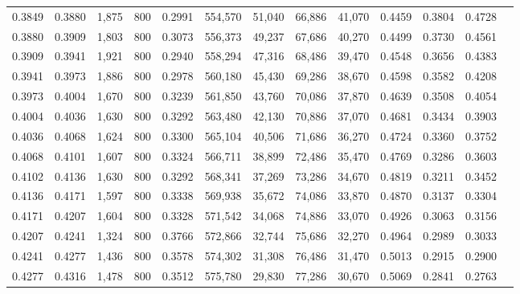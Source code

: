 \begin{tabular}{rrrrrrrrrrrrr}
0.3849 & 0.3880 &  1,875 &   800 &                                     0.2991 & 554,570 &  51,040 &  66,886 &  41,070 & 0.4459 & 0.3804 & 0.4728 \\
0.3880 & 0.3909 &  1,803 &   800 &                                     0.3073 & 556,373 &  49,237 &  67,686 &  40,270 & 0.4499 & 0.3730 & 0.4561 \\
0.3909 & 0.3941 &  1,921 &   800 &                                     0.2940 & 558,294 &  47,316 &  68,486 &  39,470 & 0.4548 & 0.3656 & 0.4383 \\
0.3941 & 0.3973 &  1,886 &   800 &                                     0.2978 & 560,180 &  45,430 &  69,286 &  38,670 & 0.4598 & 0.3582 & 0.4208 \\
0.3973 & 0.4004 &  1,670 &   800 &                                     0.3239 & 561,850 &  43,760 &  70,086 &  37,870 & 0.4639 & 0.3508 & 0.4054 \\
0.4004 & 0.4036 &  1,630 &   800 &                                     0.3292 & 563,480 &  42,130 &  70,886 &  37,070 & 0.4681 & 0.3434 & 0.3903 \\
0.4036 & 0.4068 &  1,624 &   800 &                                     0.3300 & 565,104 &  40,506 &  71,686 &  36,270 & 0.4724 & 0.3360 & 0.3752 \\
0.4068 & 0.4101 &  1,607 &   800 &                                     0.3324 & 566,711 &  38,899 &  72,486 &  35,470 & 0.4769 & 0.3286 & 0.3603 \\
0.4102 & 0.4136 &  1,630 &   800 &                                     0.3292 & 568,341 &  37,269 &  73,286 &  34,670 & 0.4819 & 0.3211 & 0.3452 \\
0.4136 & 0.4171 &  1,597 &   800 &                                     0.3338 & 569,938 &  35,672 &  74,086 &  33,870 & 0.4870 & 0.3137 & 0.3304 \\
0.4171 & 0.4207 &  1,604 &   800 &                                     0.3328 & 571,542 &  34,068 &  74,886 &  33,070 & 0.4926 & 0.3063 & 0.3156 \\
0.4207 & 0.4241 &  1,324 &   800 &                                     0.3766 & 572,866 &  32,744 &  75,686 &  32,270 & 0.4964 & 0.2989 & 0.3033 \\
0.4241 & 0.4277 &  1,436 &   800 &                                     0.3578 & 574,302 &  31,308 &  76,486 &  31,470 & 0.5013 & 0.2915 & 0.2900 \\
0.4277 & 0.4316 &  1,478 &   800 &                                     0.3512 & 575,780 &  29,830 &  77,286 &  30,670 & 0.5069 & 0.2841 & 0.2763 \\

\end{tabular}
